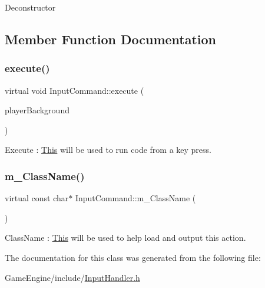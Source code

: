 Deconstructor 

\subsection{Member Function Documentation}
\mbox{\label{class_input_command_a14fb500713d0813165f0c864d47553a0}} 
\subsubsection{\texorpdfstring{execute()}{execute()}}
{\footnotesize\ttfamily virtual void Input\+Command\+::execute (\begin{DoxyParamCaption}\item[{\mbox{\hyperlink{class_game_object}{Game\+Object}} \&}]{player\+Background }\end{DoxyParamCaption})\hspace{0.3cm}{\ttfamily [pure virtual]}}

Execute \+: \mbox{\hyperlink{class_this}{This}} will be used to run code from a key press. \mbox{\label{class_input_command_aa28e1877f850c588b5a2dff8d41eb627}} 
\subsubsection{\texorpdfstring{m\+\_\+\+Class\+Name()}{m\_ClassName()}}
{\footnotesize\ttfamily virtual const char$\ast$ Input\+Command\+::m\+\_\+\+Class\+Name (\begin{DoxyParamCaption}{ }\end{DoxyParamCaption})\hspace{0.3cm}{\ttfamily [pure virtual]}}

Class\+Name \+: \mbox{\hyperlink{class_this}{This}} will be used to help load and output this action. 

The documentation for this class was generated from the following file\+:\begin{DoxyCompactItemize}
\item 
Game\+Engine/include/\mbox{\hyperlink{_input_handler_8h}{Input\+Handler.\+h}}\end{DoxyCompactItemize}
